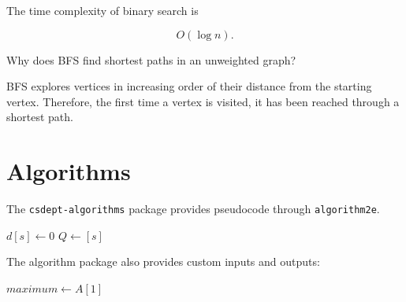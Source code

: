 \documentclass{csdept}
\begin{document}
\begin{answer}

The time complexity of binary search is

\[
    O(\log n).
\]

\end{answer}

\begin{question}[3 points]

Why does BFS find shortest paths in an unweighted graph?

\end{question}

\begin{solution}

BFS explores vertices in increasing order of their distance from
the starting vertex. Therefore, the first time a vertex is
visited, it has been reached through a shortest path.

\end{solution}

\section{Algorithms}

The \texttt{csdept-algorithms} package provides pseudocode through
\texttt{algorithm2e}.

\begin{algorithm}[H]
\caption{Breadth-First Search}



$d[s] \gets 0$\;
$Q \gets [s]$\;



\end{algorithm}

The algorithm package also provides custom inputs and outputs:

\begin{algorithm}[H]
\caption{Maximum Element}


$maximum \gets A[1]$\;



\end{algorithm}
\end{document}
